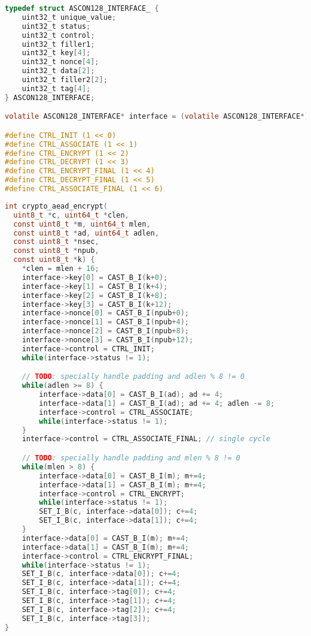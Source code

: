 \documentclass[runningheads]{llncs}
\begin{document}
\begin{lstlisting}[float=htb,language=C,caption={Memory Interface defined in C. Accessible at address 0x40000000.},label=lst:c_struct,basicstyle=\footnotesize\ttfamily]
typedef struct ASCON128_INTERFACE_ {
    uint32_t unique_value;
    uint32_t status;
    uint32_t control;
    uint32_t filler1;
    uint32_t key[4];
    uint32_t nonce[4];
    uint32_t data[2];
    uint32_t filler2[2];
    uint32_t tag[4]; 
} ASCON128_INTERFACE;

volatile ASCON128_INTERFACE* interface = (volatile ASCON128_INTERFACE*) 0x40000000;

#define CTRL_INIT (1 << 0)
#define CTRL_ASSOCIATE (1 << 1)
#define CTRL_ENCRYPT (1 << 2)
#define CTRL_DECRYPT (1 << 3)
#define CTRL_ENCRYPT_FINAL (1 << 4)
#define CTRL_DECRYPT_FINAL (1 << 5)
#define CTRL_ASSOCIATE_FINAL (1 << 6)
\end{lstlisting}

\begin{lstlisting}[float=htb,language=c,caption={Simple way of using the hardware to authenticate and encrypt data.},label=lst:c_auth_enc,basicstyle=\footnotesize\ttfamily]
int crypto_aead_encrypt(
  uint8_t *c, uint64_t *clen,
  const uint8_t *m, uint64_t mlen,
  const uint8_t *ad, uint64_t adlen,
  const uint8_t *nsec,
  const uint8_t *npub,
  const uint8_t *k) {
    *clen = mlen + 16;
    interface->key[0] = CAST_B_I(k+0);
    interface->key[1] = CAST_B_I(k+4);
    interface->key[2] = CAST_B_I(k+8);
    interface->key[3] = CAST_B_I(k+12);
    interface->nonce[0] = CAST_B_I(npub+0);
    interface->nonce[1] = CAST_B_I(npub+4);
    interface->nonce[2] = CAST_B_I(npub+8);
    interface->nonce[3] = CAST_B_I(npub+12);
    interface->control = CTRL_INIT;
    while(interface->status != 1);

    // TODO: specially handle padding and adlen % 8 != 0
    while(adlen >= 8) {
        interface->data[0] = CAST_B_I(ad); ad += 4;
        interface->data[1] = CAST_B_I(ad); ad += 4; adlen -= 8;
        interface->control = CTRL_ASSOCIATE;
        while(interface->status != 1);
    }
    interface->control = CTRL_ASSOCIATE_FINAL; // single cycle

    // TODO: specially handle padding and mlen % 8 != 0
    while(mlen > 8) {
        interface->data[0] = CAST_B_I(m); m+=4;
        interface->data[1] = CAST_B_I(m); m+=4;
        interface->control = CTRL_ENCRYPT;
        while(interface->status != 1);
        SET_I_B(c, interface->data[0]); c+=4;
        SET_I_B(c, interface->data[1]); c+=4;
    }
    interface->data[0] = CAST_B_I(m); m+=4;
    interface->data[1] = CAST_B_I(m); m+=4;
    interface->control = CTRL_ENCRYPT_FINAL;
    while(interface->status != 1);
    SET_I_B(c, interface->data[0]); c+=4;
    SET_I_B(c, interface->data[1]); c+=4;
    SET_I_B(c, interface->tag[0]); c+=4;
    SET_I_B(c, interface->tag[1]); c+=4;
    SET_I_B(c, interface->tag[2]); c+=4;
    SET_I_B(c, interface->tag[3]); 
}
\end{lstlisting}
\end{document}
